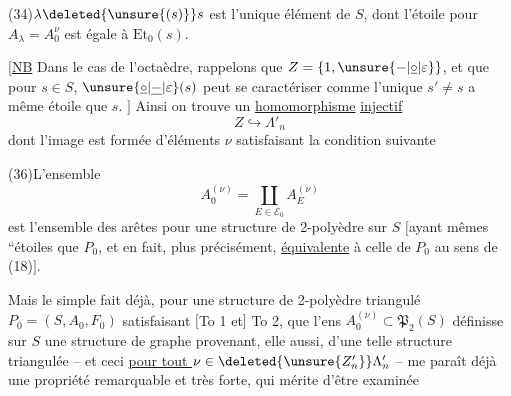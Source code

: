 
(34)\qquad $\lambda\deleted{\unsure{(s)}}s$ est l'unique élément de $S$, dont l'étoile pour $A_\lambda=A_0^{\nu}$ est égale à $\mathrm{Et}_0(s)$.

$[$\uline{NB} Dans le cas de l'octaèdre, rappelons que $Z=\{1,\unsure{-|\underline{\circ}|\varepsilon}\}$, et que pour $s\in S$, $\unsure{\underline{\circ}|\underline{-}|\varepsilon}(s)$ peut se caractériser comme l'unique $s'\ne s$   a même étoile que $s$. $]$ Ainsi on trouve un \uline{homomorphisme} \uline{injectif}
\[
Z\hookrightarrow\Lambda'_n\tag*{(35)}
\]
dont l'image est formée d'éléments $\nu$ satisfaisant la condition suivante

(36)\qquad L'ensemble  
\[
A_0^{(\nu)}=\coprod_{E\in\mathcal E_0}A_E^{(\nu)}
\]
est l'ensemble des arêtes pour une structure de 2-polyèdre sur $S$ $[$ayant mêmes ``étoiles que $P_0$, et en fait, plus précisément, \uline{équivalente} à celle de $P_0$ au sens de (18)$]$.

Mais le simple fait déjà,  pour une structure de 2-polyèdre triangulé $P_0=(S,A_0,F_0)$ satisfaisant $[$To 1 et$]$ To 2, que l'ens $A_0^{(\nu)}\subset\mathfrak P_2(S)$ définisse sur $S$ une structure de graphe provenant, elle aussi, d'une telle structure triangulée -- et ceci \uline{pour tout $\nu\in\deleted{\unsure{Z'_n}}\Lambda'_n$} -- me paraît déjà une propriété remarquable et très forte, qui mérite d'être examinée


